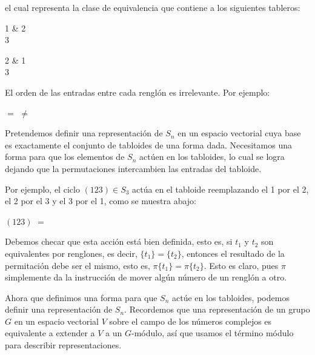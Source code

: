 \documentclass[12pt]{book}
\theoremstyle{definition}
\newcounter{in}
\newcounter{ini}
\begin{document}
\begin{center}
\end{center}

el cual representa la clase de equivalencia que contiene a los
siguientes tableros:
\begin{center}  
  \begin{ytableau}
    1 & 2  \\
    3
  \end{ytableau}\qquad
  \begin{ytableau}
    2 & 1  \\
    3
  \end{ytableau}
\end{center}

El orden de las entradas entre cada renglón es irrelevante. Por
ejemplo:

\begin{center}
  \quad$=$\quad
  \quad$\neq$\quad
\end{center}

Pretendemos definir una representación de $S_{n}$ en un espacio
vectorial cuya base es exactamente el conjunto de tabloides de una
forma dada. Necesitamos una forma para que los elementos de $S_{n}$
actúen en los tabloides, lo cual se logra dejando que la permutaciones intercambien las entradas del
tabloide.

Por ejemplo, el ciclo $(123)\in S_{3}$ actúa en el tabloide
reemplazando el 1 por el 2, el 2 por el 3 y el 3 por el 1, como se
muestra abajo:
\begin{center}
  $(123)$
  \quad$=$\quad
\end{center}

Debemos checar que esta acción está bien definida, esto es, si $t_{1}$
y $t_{2}$ son equivalentes por renglones, es decir,
$\{t_{1}\}=\{t_{2}\}$, entonces el resultado de la permitación debe
ser el mismo, esto es, $\pi\{t_{1}\}=\pi\{t_{2}\}$. Esto es claro,
pues $\pi$ simplemente da la instrucción de mover algún número de un
renglón a otro.

Ahora que definimos una forma para que $S_{n}$ actúe en los tabloides,
podemos definir una representación de $S_{n}$. Recordemos que una
representación de un grupo $G$ en un espacio vectorial $V$ sobre el
campo de los números complejos es equivalente a extender a $V$ a un $G$-módulo,
así que usamos el término módulo para describir representaciones.
\end{document}
